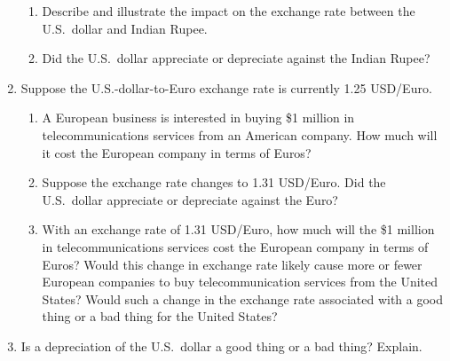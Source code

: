 \documentclass[
    letterpaper,paper=portrait,fleqn,
    DIV=16,fontsize=12pt,twoside=semi,
    parskip=full-,
    headings=standardclasses]
{scrartcl}
\begin{document}
\begin{enumerate}
\begin{enumerate}

\item Describe and illustrate the impact on the exchange rate between the U.S.~dollar and Indian
Rupee.

\vfill

\item Did the U.S.~dollar appreciate or depreciate against the Indian Rupee?

\vspace{3.0\baselineskip}

\end{enumerate}

\clearpage

\item Suppose the U.S.-dollar-to-Euro exchange rate is currently 1.25 USD/Euro.

\begin{enumerate}

\item A European business is interested in buying \$1 million in telecommunications services from an
American company. How much will it cost the European company in terms of Euros?

\vfill

\item Suppose the exchange rate changes to 1.31 USD/Euro. Did the U.S.~dollar appreciate or depreciate
against the Euro?

\vfill

\item With an exchange rate of 1.31 USD/Euro, how much will the \$1 million in telecommunications
services cost the European company in terms of Euros? Would this change in exchange rate likely
cause more or fewer European companies to buy telecommunication services from the United
States? Would such a change in the exchange rate associated with a good thing or a bad thing
for the United States?

\vfill

\end{enumerate}

\item Is a depreciation of the U.S.~dollar a good thing or a bad thing? Explain.

\vfill

\end{enumerate}

\vspace{-2.0\baselineskip}
\end{document}
